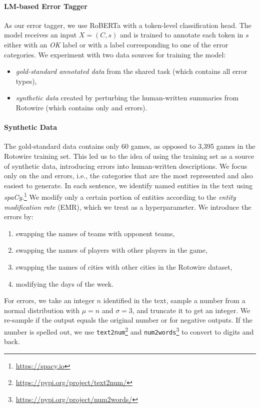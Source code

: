 \paragraph{LM-based Error Tagger}
As our error tagger, we use RoBERTa \cite{liuRoBERTaRobustlyOptimized2019} with a token-level classification head. The model receives an input $X = (C, s)$ and is trained to annotate each token in $s$ either with an \textit{OK} label or with a label corresponding to one of the error categories. We experiment with two data sources for training the model:
\begin{itemize}
    \item \emph{gold-standard annotated data} from the shared task (which contains all error types),
    \item \emph{synthetic data} created by perturbing the human-written summaries from Rotowire (which contains only  and  errors).
\end{itemize}

\paragraph{Synthetic Data} The gold-standard data contains only 60 games, as opposed to 3,395 games in the Rotowire training set. This led us to the idea of using the training set as a source of synthetic data, introducing errors into human-written descriptions. We focus only on the  and  errors, i.e., the categories that are the most represented and also easiest to generate. In each sentence, we identify named entities in the text using \emph{spaCy}.\footnote{\url{https://spacy.io}} We modify only a certain portion of entities according to the \emph{entity modification rate} (EMR), which we treat as a hyperparameter. We introduce the  errors by:
\begin{enumerate}
    \item swapping the names of teams with opponent teams,
    \item swapping the names of players with other players in the game,
    \item swapping the names of cities with other cities in the Rotowire dataset,
    \item modifying the days of the week.
\end{enumerate}
For  errors, we take an integer $n$ identified in the text, sample a number from a normal distribution with $\mu=n$ and $\sigma=3$, and truncate it to get an integer. We re-sample if the output equals the original number or for negative outputs. If the number is spelled out, we use \texttt{text2num}\footnote{\url{https://pypi.org/project/text2num/}} and  \texttt{num2words}\footnote{\url{https://pypi.org/project/num2words/}} to convert to digits and back.


